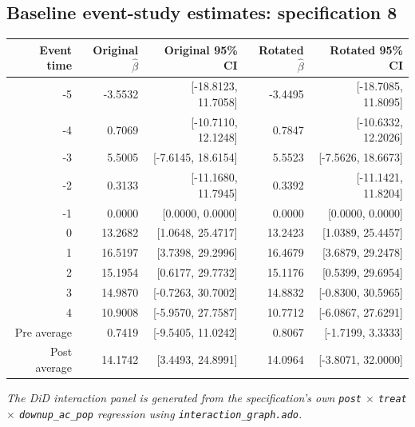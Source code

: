 \documentclass[10pt]{article}
\begin{document}
\subsection*{Baseline event-study estimates: specification 8}
\begin{center}
\scriptsize
\begin{tabular}{r rr rr}
\toprule
Event time & Original $\hat\beta$ & Original 95\% CI & Rotated $\hat\beta$ & Rotated 95\% CI \\
\midrule
-5 & -3.5532 & [-18.8123, 11.7058] & -3.4495 & [-18.7085, 11.8095] \\
-4 & 0.7069 & [-10.7110, 12.1248] & 0.7847 & [-10.6332, 12.2026] \\
-3 & 5.5005 & [-7.6145, 18.6154] & 5.5523 & [-7.5626, 18.6673] \\
-2 & 0.3133 & [-11.1680, 11.7945] & 0.3392 & [-11.1421, 11.8204] \\
-1 & 0.0000 & [0.0000, 0.0000] & 0.0000 & [0.0000, 0.0000] \\
0 & 13.2682 & [1.0648, 25.4717] & 13.2423 & [1.0389, 25.4457] \\
1 & 16.5197 & [3.7398, 29.2996] & 16.4679 & [3.6879, 29.2478] \\
2 & 15.1954 & [0.6177, 29.7732] & 15.1176 & [0.5399, 29.6954] \\
3 & 14.9870 & [-0.7263, 30.7002] & 14.8832 & [-0.8300, 30.5965] \\
4 & 10.9008 & [-5.9570, 27.7587] & 10.7712 & [-6.0867, 27.6291] \\
\midrule
Pre average & 0.7419 & [-9.5405, 11.0242] & 0.8067 & [-1.7199, 3.3333] \\
Post average & 14.1742 & [3.4493, 24.8991] & 14.0964 & [-3.8071, 32.0000] \\
\bottomrule
\end{tabular}
\end{center}
\medskip
\textit{The DiD interaction panel is generated from the specification's own \texttt{post} $\times$ \texttt{treat} $\times$ \texttt{downup\_ac\_pop} regression using \texttt{interaction\_graph.ado}.}
\clearpage
\end{document}
